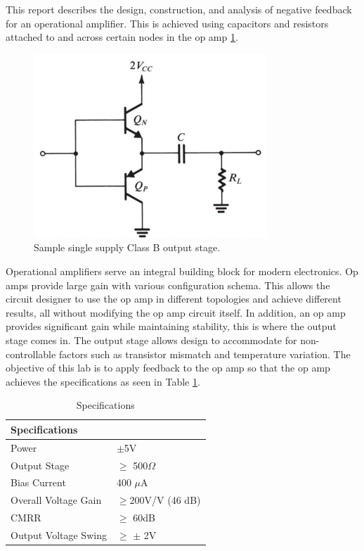 



This report describes the design, construction, and analysis of negative feedback for an operational amplifier. This is achieved using capacitors and resistors attached to and across certain nodes in the op amp \ref{fig:sample}.

\begin{figure}[H]
    \begin{center}
    \includegraphics[scale=.45]{Introduction/outputstage.png}
    \caption{Sample single supply Class B output stage. \cite{b1}}
    \label{fig:sample}
    \end{center}
    
\end{figure}
Operational amplifiers serve an integral building block for modern electronics. Op amps provide large gain with various configuration schema. This allows the circuit designer to use the op amp in different topologies and achieve different results, all without modifying the op amp circuit itself. In addition, an op amp provides significant gain while maintaining stability, this is where the output stage comes in. The output stage allows design to accommodate for non-controllable factors such as transistor mismatch and temperature variation.   The objective of this lab is to apply feedback to the op amp so that the op amp achieves the specifications as seen in Table \ref{tab:labspecs}.


\begin{table}[H]
\centering
\caption{Specifications}
\label{tab:labspecs}
\begin{tabular}{|l|l|}
\hline
\textbf{Specifications} &                 \\ \hline
Power                   & $\pm$5V         \\ \hline
Output Stage 			& $\geq$ 500$\Omega$ \\ \hline
Bias Current            & 400 $\mu$A      \\ \hline
Overall Voltage Gain    & $\geq$200V/V (46 dB)  \\ \hline
CMRR                    & $\geq$ 60dB     \\ \hline
Output Voltage Swing    & $\geq$ $\pm$ 2V \\ \hline
\end{tabular}
\end{table}

